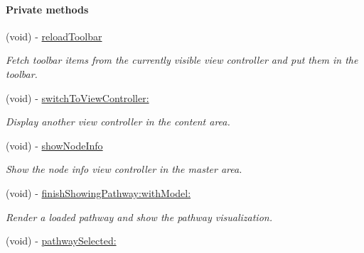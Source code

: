 \begin{Indent}\paragraph*{Private methods}
\begin{DoxyCompactItemize}
\item 
\hypertarget{interface_p_c_detail_view_controller_a3347f6171a46ca16109e6460571ab110}{
(void) -\/ \hyperlink{interface_p_c_detail_view_controller_a3347f6171a46ca16109e6460571ab110}{reloadToolbar}}
\label{interface_p_c_detail_view_controller_a3347f6171a46ca16109e6460571ab110}

\begin{DoxyCompactList}\small\item\em Fetch toolbar items from the currently visible view controller and put them in the toolbar. \end{DoxyCompactList}\item 
\hypertarget{interface_p_c_detail_view_controller_a4442568531c5e24e42498d4aeb8d683b}{
(void) -\/ \hyperlink{interface_p_c_detail_view_controller_a4442568531c5e24e42498d4aeb8d683b}{switchToViewController:}}
\label{interface_p_c_detail_view_controller_a4442568531c5e24e42498d4aeb8d683b}

\begin{DoxyCompactList}\small\item\em Display another view controller in the content area. \end{DoxyCompactList}\item 
\hypertarget{interface_p_c_detail_view_controller_ad1c9890056434693924b8af3afee001e}{
(void) -\/ \hyperlink{interface_p_c_detail_view_controller_ad1c9890056434693924b8af3afee001e}{showNodeInfo}}
\label{interface_p_c_detail_view_controller_ad1c9890056434693924b8af3afee001e}

\begin{DoxyCompactList}\small\item\em Show the node info view controller in the master area. \end{DoxyCompactList}\item 
\hypertarget{interface_p_c_detail_view_controller_aa9bdcbe71c58b1d2fe3583b1138f20ab}{
(void) -\/ \hyperlink{interface_p_c_detail_view_controller_aa9bdcbe71c58b1d2fe3583b1138f20ab}{finishShowingPathway:withModel:}}
\label{interface_p_c_detail_view_controller_aa9bdcbe71c58b1d2fe3583b1138f20ab}

\begin{DoxyCompactList}\small\item\em Render a loaded pathway and show the pathway visualization. \end{DoxyCompactList}\item 
\hypertarget{interface_p_c_detail_view_controller_ac217bec905169863d26aca38b8a2c3e7}{
(void) -\/ \hyperlink{interface_p_c_detail_view_controller_ac217bec905169863d26aca38b8a2c3e7}{pathwaySelected:}}
\label{interface_p_c_detail_view_controller_ac217bec905169863d26aca38b8a2c3e7}


\end{DoxyCompactItemize}
\end{Indent}
